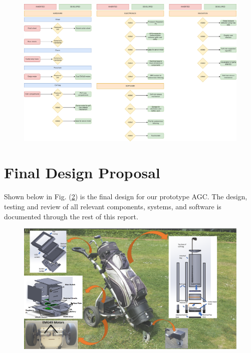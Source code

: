 \documentclass[11pt,landscape]{article}
\begin{document}
\begin{figure}[H]
    \begin{center}
        \includegraphics[width=\textwidth]{inheritance.png}
    \end{center}
    \label{fig:inheritance}
\end{figure}


\newpage

\section{Final Design Proposal}
Shown below in Fig. (\ref{fig:final_proposal}) is the final design for our
prototype AGC. The design, testing and review of all relevant components, systems, and software is
documented through the rest of this report.

\begin{figure}[H]
    \begin{center}
        \includegraphics[width=\textwidth]{final_proposal.PNG}
    \end{center}
    \label{fig:final_proposal}
\end{figure}
\end{document}
